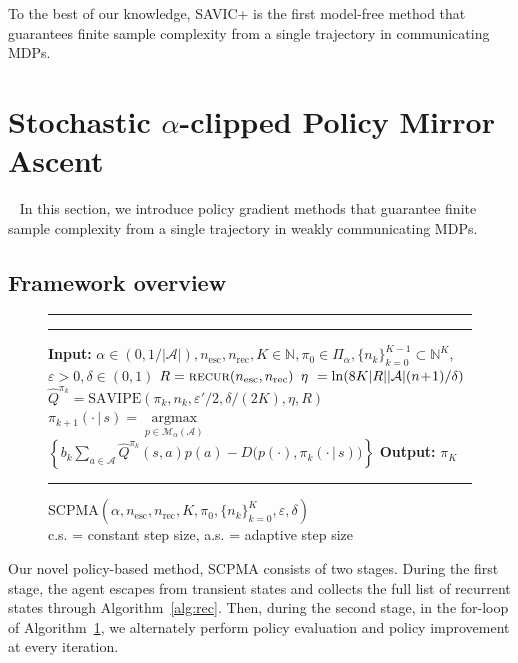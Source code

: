 \documentclass{article}
\theoremstyle{definition}
\theoremstyle{remark}
\DeclareMathOperator*{\argmax}{argmax}
\newcommand{\cA}{\mathcal{A}}
\newcommand{\cM}{\mathcal{M}}
\newcommand{\NN}{\mathbb{N}}
\begin{document}
To the best of our knowledge, SAVIC+ is the first model-free method that guarantees finite sample complexity from a single trajectory in communicating MDPs.


\section{Stochastic $\alpha$-clipped Policy Mirror Ascent}~\label{sec:pol}
In this section, we introduce policy gradient methods that guarantee finite sample complexity from a single trajectory in weakly communicating MDPs. 






\subsection{Framework overview}

\begin{figure}
\vspace{-.16in}
\captionsetup{type=algorithm}
\hrule
\vspace{2pt}
\begin{minipage}{0.58\textwidth}
  \caption{SCPMA$(\alpha, n_{\mathrm{esc}},n_{\mathrm{rec}},K,\pi_0, \{n_{k}\}^K_{k=0}, \varepsilon, \delta)$\\c.s. = constant step size, a.s. = adaptive step size}
\label{alg:SCPMA}
\vspace{-.1in}
\hrule
\begin{algorithmic}
\State \textbf{Input:} $\alpha\!\in\!(0,1/|\mathcal{A}|), n_{\mathrm{esc}},n_{\mathrm{rec}},K\!\in\!\NN,\pi_0\!\in\!\Pi_\alpha,\{n_k\}^{K-1}_{k=0}\!\subset\!\NN^K$, $\varepsilon>0, \delta\in(0,1)$
   \State $R=\mbox{\sc recur}(n_{\mathrm{esc}}, n_{\mathrm{rec}})$
     \State $\eta\hspace{0.8ex}=\ln(8K|R||\cA|(n\!+\!1)/\delta)$
\State $\hat{Q}^{\pi_k} =\mbox{SAVIPE}( \pi_k,  n_k,  \varepsilon'/2,\delta/(2K), \eta,R)$
        \State $\pi_{k+1}(\cdot \,|\, s)=
 \underset{p\in \cM_\alpha (\cA)}{\argmax}$
 \State $\left\{
 b_k \sum_{a \in \cA}\hat{Q}^{\pi_k}(s,a)p(a)
 - D\big(p(\cdot),\pi_{k}(\cdot \,|\, s)\big)\right\}$
\EndFor
\EndFor
\State \textbf{Output:} $\pi_K$ 
\end{algorithmic}
\hrule
\end{minipage}
\vspace{-.3in}
\end{figure}
Our novel policy-based method, SCPMA consists of two stages. During the first stage, the agent escapes from transient states and collects the full list of recurrent states through Algorithm~\ref{alg:rec}. Then, during the second stage, in the for-loop of Algorithm~\ref{alg:SCPMA}, we alternately perform policy evaluation and policy improvement at every iteration. 
\end{document}
